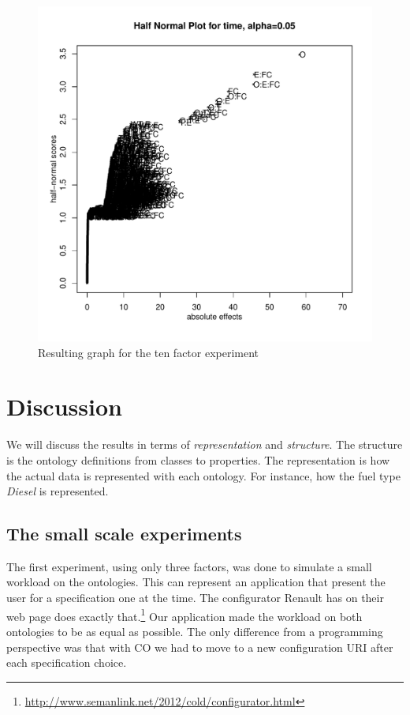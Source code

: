 \documentclass{llncs}
\begin{document}
\begin{figure}
 \includegraphics[width=14cm]{10factorAvarageDanielPlot.pdf}
  \caption{Resulting graph for the ten factor experiment}\label{10factorGraph}
\end{figure}

\section{Discussion}

We will discuss the results in terms of \emph{representation} and
\emph{structure}. The structure is the ontology definitions from
classes to properties.  The representation is how the actual data is
represented with each ontology. For instance, how the fuel type
\emph{Diesel} is represented.

\subsection{The small scale experiments}
The first experiment, using only three factors, was done to simulate a
small workload on the ontologies. This can represent an application
that present the user for a specification one at the time. The
configurator Renault has on their web page does exactly
that.\footnote{\url{http://www.semanlink.net/2012/cold/configurator.html}}
Our application made the workload on both ontologies to be as equal as
possible.  The only difference from a programming perspective was that
with CO we had to move to a new configuration URI after each
specification choice.
\end{document}
